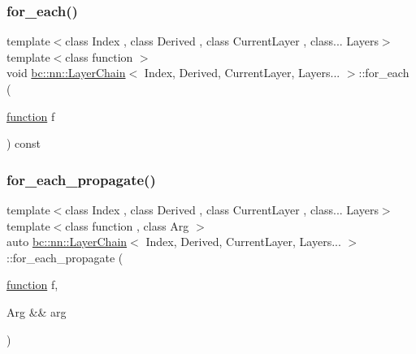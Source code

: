 \subsubsection{\texorpdfstring{for\+\_\+each()}{for\_each()}\hspace{0.1cm}{\footnotesize\ttfamily [2/2]}}
{\footnotesize\ttfamily template$<$class Index , class Derived , class Current\+Layer , class... Layers$>$ \\
template$<$class function $>$ \\
void \hyperlink{structbc_1_1nn_1_1LayerChain}{bc\+::nn\+::\+Layer\+Chain}$<$ Index, Derived, Current\+Layer, Layers... $>$\+::for\+\_\+each (\begin{DoxyParamCaption}\item[{\hyperlink{namespacebc_1_1nn_a0fef36d0002a6d7c7cb619d7e27d5c1e}{function}}]{f }\end{DoxyParamCaption}) const\hspace{0.3cm}{\ttfamily [inline]}}

\mbox{\label{structbc_1_1nn_1_1LayerChain_3_01Index_00_01Derived_00_01CurrentLayer_00_01Layers_8_8_8_01_4_a6526c948665cccba9ce4079fd25df897}} 
\subsubsection{\texorpdfstring{for\+\_\+each\+\_\+propagate()}{for\_each\_propagate()}\hspace{0.1cm}{\footnotesize\ttfamily [1/2]}}
{\footnotesize\ttfamily template$<$class Index , class Derived , class Current\+Layer , class... Layers$>$ \\
template$<$class function , class Arg $>$ \\
auto \hyperlink{structbc_1_1nn_1_1LayerChain}{bc\+::nn\+::\+Layer\+Chain}$<$ Index, Derived, Current\+Layer, Layers... $>$\+::for\+\_\+each\+\_\+propagate (\begin{DoxyParamCaption}\item[{\hyperlink{namespacebc_1_1nn_a0fef36d0002a6d7c7cb619d7e27d5c1e}{function}}]{f,  }\item[{Arg \&\&}]{arg }\end{DoxyParamCaption})\hspace{0.3cm}{\ttfamily [inline]}}


